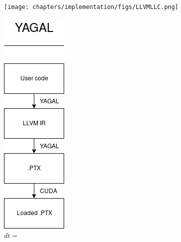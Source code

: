 \begin{figure}[!htb]
    \centering
    \begin{minipage}{.7\textwidth}
        \centering
        \texttt{[image: chapters/implementation/figs/LLVMLLC.png]}
        \caption{$dt=0.1$}
        \label{fig:prob1_6_2}
    \end{minipage}%
    \begin{minipage}{0.4\textwidth}
        \centering
        \includegraphics[width=0.5\linewidth]{chapters/implementation/figs/YAGALLLC.png}
        \caption{$dt =$}
        \label{fig:prob1_6_1}
    \end{minipage}
\end{figure}


